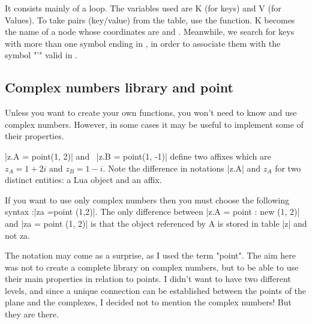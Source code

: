 It consists mainly of a loop. The variables used are K (for keys) and V (for Values). To take pairs (key/value) from the  table, use the  function. K becomes the name of a node whose coordinates are  and . Meanwhile, we search for keys with more than one symbol ending in , in order to associate them with the symbol "'" valid in \TIKZ{}.



\subsection{Complex numbers library and point} %
\label{sub:complex_numbers}

Unless you want to create your own functions, you won't need to know and use complex numbers. However, in some cases it may be useful to implement some of their properties.


|z.A = point(1, 2)| and \ |z.B = point(1, -1)| define two affixes which are $z_A = 1+2i$ and $z_B = 1-i$. Note the difference in notations |z.A| and $z_A$ for two distinct entities: a Lua object and an affix. 

\vspace{1em}
If you want to use only complex numbers then you must choose the following syntax :|za =point (1,2)|.
The only difference between |z.A = point : new (1, 2)| and |za = point (1, 2)| is that the object referenced by A is stored in table |z| and not za.

 The notation may come as a surprise, as I used the term "point". The aim here was not to create a complete library on complex numbers, but to be able to use their main properties in relation to points. I didn't want to have two different levels, and since a unique connection can be established between the points of the plane and the complexes, I decided not to mention the complex numbers! But they are there.


